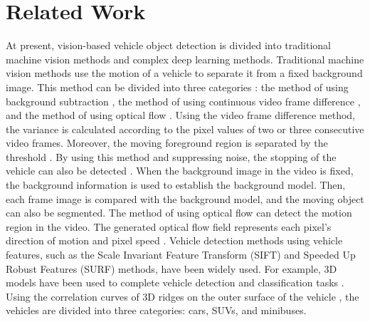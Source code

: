 \chapter[Related Work]{Related Work}

\regularsection
\headerregularsection

\updatemylof %

\begin{sloppypar} %


  At present, vision-based vehicle object detection is divided into traditional machine vision methods and complex deep learning methods. Traditional machine vision methods use the motion of a vehicle to separate it from a fixed background image. This method can be divided into three categories \cite{abdulrahim2016traffic}: the method of using background subtraction \cite{radhakrishnan2013video}, the method of using continuous video frame difference \cite{li2011vehicles}, and the method of using optical flow \cite{6746425}. Using the video frame difference method, the variance is calculated according to the pixel values of two or three consecutive video frames. Moreover, the moving foreground region is separated by the threshold \cite{li2011vehicles}. By using this method and suppressing noise, the stopping of the vehicle can also be detected \cite{park2007video}. When the background image in the video is fixed, the background information is used to establish the background model. Then, each frame image is compared with the background model, and the moving object can also be segmented. The method of using optical flow can detect the motion region in the video. The generated optical flow field represents each pixel’s direction of motion and pixel speed \cite{674625}. Vehicle detection methods using vehicle features, such as the Scale Invariant Feature Transform (SIFT) and Speeded Up Robust Features (SURF) methods, have been widely used. For example, 3D models have been used to complete vehicle detection and classification tasks \cite{BMVC.9.13}. Using the correlation curves of 3D ridges on the outer surface of the vehicle \cite{1570927}, the vehicles are divided into three categories: cars, SUVs, and minibuses.


\end{sloppypar}
